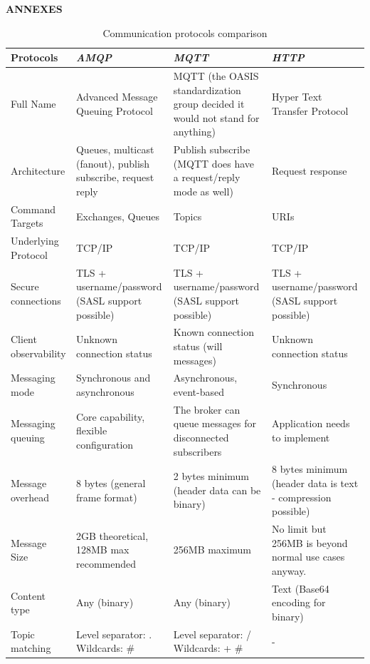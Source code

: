 \newpage
\onecolumn
\centering\textbf{ANNEXES}

\begin{table}[htbp]
    \caption{Communication protocols comparison}
    \begin{center}
    \renewcommand{\arraystretch}{2}
    \begin{tabular}{|p{3cm}|p{4.5cm}|p{4.5cm}|p{4.5cm}|}
    \hline
    \textbf{{Protocols}}& \textbf{\textit{AMQP}}& \textbf{\textit{MQTT}}& \textbf{\textit{HTTP}} \\
    \hline
    Full Name & Advanced Message Queuing Protocol & MQTT (the OASIS standardization group decided it would not stand for anything) & Hyper Text Transfer Protocol\\
    \hline
    Architecture & Queues, multicast (fanout), publish subscribe, request reply & Publish subscribe (MQTT does have a request/reply mode as well) & Request response\\
    \hline
    Command Targets & Exchanges, Queues & Topics & URIs\\
    \hline
    Underlying Protocol & TCP/IP & TCP/IP & TCP/IP\\
    \hline
    Secure connections & TLS + username/password (SASL support possible) & TLS + username/password (SASL support possible) & TLS + username/password (SASL support possible)\\
    \hline
    Client observability & Unknown connection status & Known connection status (will messages) & Unknown connection status\\
    \hline
    Messaging mode & Synchronous and asynchronous & Asynchronous, event-based & Synchronous\\
    \hline
    Messaging queuing & Core capability, flexible configuration & The broker can queue messages for disconnected subscribers & Application needs to implement\\
    \hline
    Message overhead & 8 bytes (general frame format) & 2 bytes minimum (header data can be binary) & 8 bytes minimum (header data is text - compression possible)\\
    \hline
    Message Size & 2GB theoretical, 128MB max recommended & 256MB maximum & No limit but 256MB is beyond normal use cases anyway.\\
    \hline
    Content type & Any (binary) & Any (binary) & Text (Base64 encoding for binary)\\
    \hline
    Topic matching & Level separator: . Wildcards: \* \# & Level separator: / Wildcards: + \# & - \\

\end{tabular}
\end{center}
\end{table}
